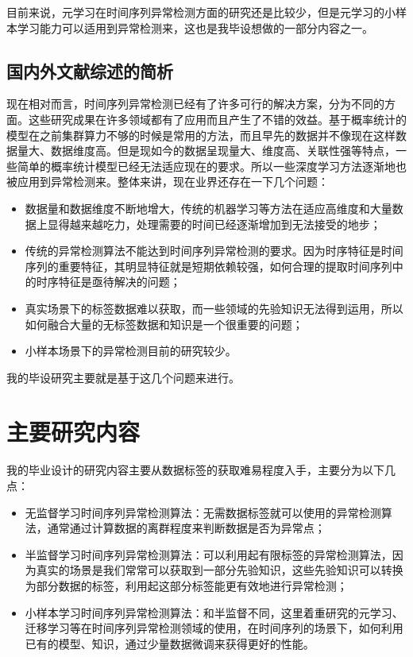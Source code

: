 目前来说，元学习在时间序列异常检测方面的研究还是比较少，但是元学习的小样本学习能力可以适用到异常检测来，这也是我毕设想做的一部分内容之一。

\subsection{国内外文献综述的简析}

现在相对而言，时间序列异常检测已经有了许多可行的解决方案，分为不同的方面。这些研究成果在许多领域都有了应用而且产生了不错的效益。基于概率统计的模型在之前集群算力不够的时候是常用的方法，而且早先的数据并不像现在这样数据量大、数据维度高。但是现如今的数据呈现量大、维度高、关联性强等特点，一些简单的概率统计模型已经无法适应现在的要求。所以一些深度学习方法逐渐地也被应用到异常检测来。整体来讲，现在业界还存在一下几个问题：

\begin{itemize}
    \item 数据量和数据维度不断地增大，传统的机器学习等方法在适应高维度和大量数据上显得越来越吃力，处理需要的时间已经逐渐增加到无法接受的地步；
    \item 传统的异常检测算法不能达到时间序列异常检测的要求。因为时序特征是时间序列的重要特征，其明显特征就是短期依赖较强，如何合理的提取时间序列中的时序特征是亟待解决的问题；
    \item 真实场景下的标签数据难以获取，而一些领域的先验知识无法得到运用，所以如何融合大量的无标签数据和知识是一个很重要的问题；
    \item 小样本场景下的异常检测目前的研究较少。
\end{itemize}

我的毕设研究主要就是基于这几个问题来进行。

\section{主要研究内容}

我的毕业设计的研究内容主要从数据标签的获取难易程度入手，主要分为以下几点：

\begin{itemize}
    \item 无监督学习时间序列异常检测算法：无需数据标签就可以使用的异常检测算法，通常通过计算数据的离群程度来判断数据是否为异常点；
    \item 半监督学习时间序列异常检测算法：可以利用起有限标签的异常检测算法，因为真实的场景是我们常常可以获取到一部分先验知识，这些先验知识可以转换为部分数据的标签，利用起这部分标签能更有效地进行异常检测；
    \item 小样本学习时间序列异常检测算法：和半监督不同，这里着重研究的元学习、迁移学习等在时间序列异常检测领域的使用，在时间序列的场景下，如何利用已有的模型、知识，通过少量数据微调来获得更好的性能。
\end{itemize}

